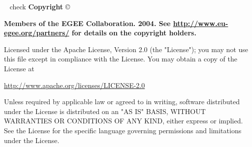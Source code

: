 %
%
%
~
\vfill{}
\TODO check
{\bf
Copyright} \copyright\ {\bf Members of the EGEE Collaboration. 2004.  See
\href{http://www.eu-egee.org/partners/}{http://www.eu-egee.org/partners/} for
details on the copyright holders.  

Licensed under the Apache License, Version 2.0 (the "License"); you may not use
this file except in compliance with the License.  You may obtain a copy of the
License at 

\begin{center}
\href{http://www.apache.org/licenses/LICENSE-2.0}{http://www.apache.org/licenses/LICENSE-2.0}
\end{center}

Unless required by applicable law or agreed to in writing, software distributed
under the License is distributed on an "AS IS" BASIS, WITHOUT WARRANTIES OR
CONDITIONS OF ANY KIND, either express or implied.  See the License for the
specific language governing permissions and limitations under the License.
}
\clearpage
